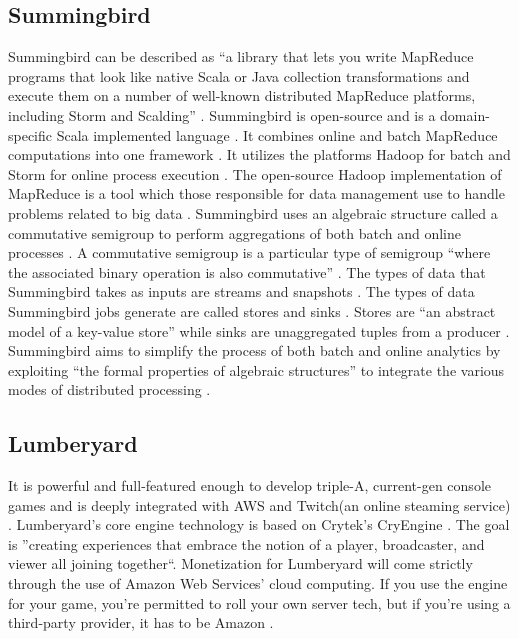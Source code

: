      \pv

     
\subsection{Summingbird }
     
     Summingbird can be described as ``a library that lets you
     write MapReduce programs that look like
     native Scala or Java collection transformations and execute them
     on a number of well-known distributed MapReduce platforms,
     including Storm and Scalding'' \cite{summingbirdgit}. Summingbird
     is open-source and is
     a domain-specific Scala implemented language
     \cite{boykin2014summingbird}. It combines online and batch
     MapReduce computations into one framework
     \cite{boykin2014summingbird}. It utilizes the platforms Hadoop
     for batch and Storm for online process execution
     \cite{boykin2014summingbird}. The open-source Hadoop
     implementation of MapReduce is a tool which those responsible for
     data management use to handle problems related to big data
     \cite{boykin2014summingbird}. Summingbird uses an algebraic
     structure called a commutative semigroup to perform aggregations
     of both batch and online processes
     \cite{boykin2014summingbird}. A commutative semigroup is a
     particular type of semigroup ``where the associated binary
     operation is also commutative'' \cite{boykin2014summingbird}.
     The types of data that Summingbird takes as inputs are streams
     and snapshots \cite{boykin2014summingbird}. The types of data
     Summingbird jobs generate are called stores and sinks
     \cite{boykin2014summingbird}. Stores are ``an abstract model of a
     key-value store'' while sinks are unaggregated tuples from a
     producer \cite{boykin2014summingbird}. Summingbird aims to
     simplify the process of both batch and online analytics by
     exploiting ``the formal properties of algebraic structures'' to
     integrate the various modes of distributed processing
     \cite{boykin2014summingbird}.

     \pv
	   
\subsection{Lumberyard}
     
     It is powerful and full-featured enough to develop triple-A,
     current-gen console games and is deeply integrated with AWS and
     Twitch(an online steaming service)
     \cite{gamasutra}. Lumberyard's core engine technology is based
     on Crytek's CryEngine \cite{hands}. The goal is ''creating
     experiences that embrace the notion of a player, broadcaster, and
     viewer all joining together``\cite{gamasutra}. Monetization for
     Lumberyard will come strictly through the use of Amazon Web
     Services' cloud computing. If you use the engine for your game,
     you're permitted to roll your own server tech, but if you're
     using a third-party provider, it has to be Amazon \cite{what}.

